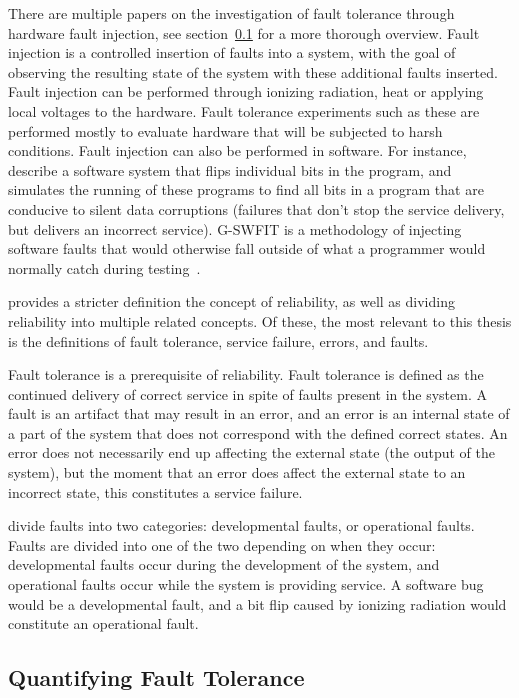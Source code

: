 There are multiple papers on the investigation of fault tolerance through hardware fault injection, see section~\ref{section:Verifying_fault_tolerance} for a more thorough overview. Fault injection is a controlled insertion of faults into a system, with the goal of observing the resulting state of the system with these additional faults inserted. Fault injection can be performed through ionizing radiation, heat or applying local voltages to the hardware. Fault tolerance experiments such as these are performed mostly to evaluate hardware that will be subjected to harsh conditions. 
Fault injection can also be performed in software. For instance,~\citet{venkatagiri2019gem5} describe a software system that flips individual bits in the program, and simulates the running of these programs to find all bits in a program that are conducive to silent data corruptions (failures that don't stop the service delivery, but delivers an incorrect service).  G-SWFIT is a methodology of injecting software faults that would otherwise fall outside of what a programmer would normally catch during testing~\citep{natella2012fault}.

\citet{avizienis2004basic} provides a stricter definition the concept of reliability, as well as dividing reliability into multiple related concepts. Of these, the most relevant to this thesis is the definitions of fault tolerance, service failure, errors, and faults.  

Fault tolerance is a prerequisite of reliability. Fault tolerance is defined as the continued delivery of correct service in spite of faults present in the system. A fault is an artifact that may result in an error, and an error is an internal state of a part of the system that does not correspond with the defined correct states. An error does not necessarily end up affecting the external state (the output of the system), but the moment that an error does affect the external state to an incorrect state, this constitutes a service failure.

\citet{avizienis2004basic} divide faults into two categories: developmental faults, or operational faults. Faults are divided into one of the two depending on when they occur: developmental faults occur during the development of the system, and operational faults occur while the system is providing service. A software bug would be a developmental fault, and a bit flip caused by ionizing radiation would constitute an operational fault.

\subsection{Quantifying Fault Tolerance}
\label{section:Verifying_fault_tolerance}


